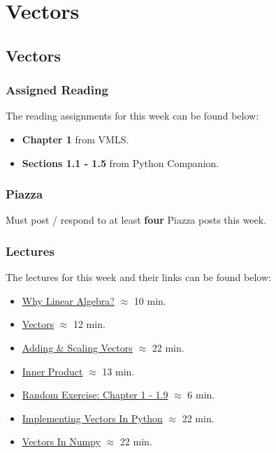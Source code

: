 \clearpage

\newcommand{\ChapTitle}{Vectors}
\newcommand{\SectionTitle}{Vectors}

\chapter{\ChapTitle}
\section{\SectionTitle}

\subsection{Assigned Reading}

The reading assignments for this week can be found below:

\begin{itemize}
    \item \textbf{Chapter 1} from VMLS.
    \item \textbf{Sections 1.1 - 1.5} from Python Companion.
\end{itemize}

\subsection{Piazza}

Must post / respond to at least \textbf{four} Piazza posts this week.  

\subsection{Lectures}

The lectures for this week and their links can be found below:

\begin{itemize}
    \item \href{https://applied.cs.colorado.edu/mod/hvp/view.php?id=50664}{Why Linear Algebra?} $\approx$ 10 min.
    \item \href{https://applied.cs.colorado.edu/mod/hvp/view.php?id=50666}{Vectors} $\approx$ 12 min.
    \item \href{https://applied.cs.colorado.edu/mod/hvp/view.php?id=50667}{Adding \& Scaling Vectors} $\approx$ 22 min.
    \item \href{https://applied.cs.colorado.edu/mod/hvp/view.php?id=50668}{Inner Product} $\approx$ 13 min.
    \item \href{https://applied.cs.colorado.edu/mod/hvp/view.php?id=50669}{Random Exercise: Chapter 1 - 1.9} $\approx$ 6 min.
    \item \href{https://applied.cs.colorado.edu/mod/hvp/view.php?id=50670}{Implementing Vectors In Python} $\approx$ 22 min.
    \item \href{https://applied.cs.colorado.edu/mod/hvp/view.php?id=50671}{Vectors In Numpy} $\approx$ 22 min.
\end{itemize}

